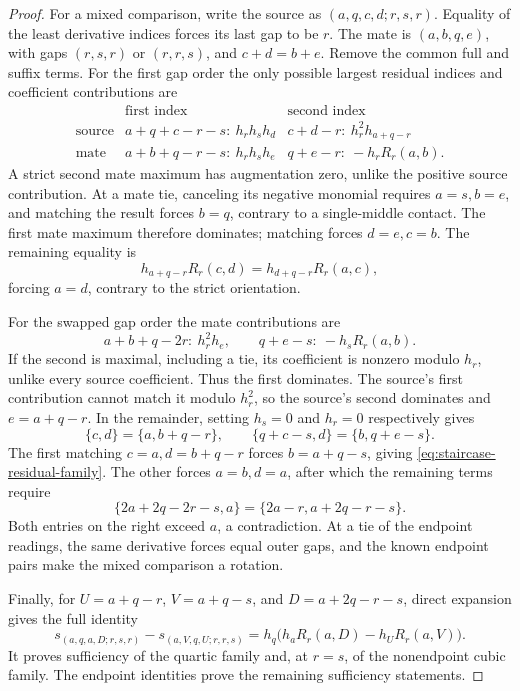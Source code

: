 \documentclass[11pt,a4paper]{amsart}
\numberwithin{equation}{section}
\theoremstyle{plain}
\theoremstyle{definition}
\begin{document}
\begin{proof}
For a mixed comparison, write the source as
\((a,q,c,d;r,s,r)\).  Equality of the least derivative indices forces
its last gap to be \(r\).  The mate is \((a,b,q,e)\), with gaps
\((r,s,r)\) or \((r,r,s)\), and
\(c+d=b+e\).  Remove the common full and suffix terms.
For the first gap order the only possible largest residual indices and
coefficient contributions are
\[
\begin{array}{c|cc}
&\text{first index}&\text{second index}\\\hline
\text{source}&a+q+c-r-s:\ h_rh_sh_d&c+d-r:\ h_r^2h_{a+q-r}\\
\text{mate}&a+b+q-r-s:\ h_rh_sh_e&q+e-r:\ -h_rR_r(a,b).
\end{array}
\]
A strict second mate maximum has augmentation zero, unlike the positive
source contribution.  At a mate tie, canceling its negative monomial
requires \(a=s,b=e\), and matching the result forces \(b=q\), contrary
to a single-middle contact.  The first mate maximum therefore dominates;
matching forces \(d=e,c=b\).  The remaining equality is
\[
 h_{a+q-r}R_r(c,d)=h_{d+q-r}R_r(a,c),
\]
forcing \(a=d\), contrary to the strict orientation.

For the swapped gap order the mate contributions are
\[
 a+b+q-2r:\ h_r^2h_e,
 \qquad q+e-s:\ -h_sR_r(a,b).
\]
If the second is maximal, including a tie, its coefficient is nonzero
modulo \(h_r\), unlike every source coefficient.  Thus the first
dominates.  The source's first contribution cannot match it modulo
\(h_r^2\), so the source's second dominates and
\(e=a+q-r\).  In the remainder, setting \(h_s=0\) and \(h_r=0\)
respectively gives
\[
 \{c,d\}=\{a,b+q-r\},\qquad
 \{q+c-s,d\}=\{b,q+e-s\}.
\]
The first matching \(c=a,d=b+q-r\) forces \(b=a+q-s\), giving
\eqref{eq:staircase-residual-family}.  The other forces \(a=b,d=a\),
after which the remaining terms require
\[
 \{2a+2q-2r-s,a\}=\{2a-r,a+2q-r-s\}.
\]
Both entries on the right exceed \(a\), a contradiction.
At a tie of the endpoint readings, the same derivative forces equal
outer gaps, and the known endpoint pairs make the mixed comparison a
rotation.

Finally, for \(U=a+q-r\), \(V=a+q-s\), and
\(D=a+2q-r-s\), direct expansion gives the full identity
\[
 s_{(a,q,a,D;r,s,r)}-s_{(a,V,q,U;r,r,s)}
 =h_q\bigl(h_aR_r(a,D)-h_UR_r(a,V)\bigr).
\]
It proves sufficiency of the quartic family and, at \(r=s\), of the
nonendpoint cubic family.  The endpoint identities prove the remaining
sufficiency statements.
\end{proof}
\end{document}
